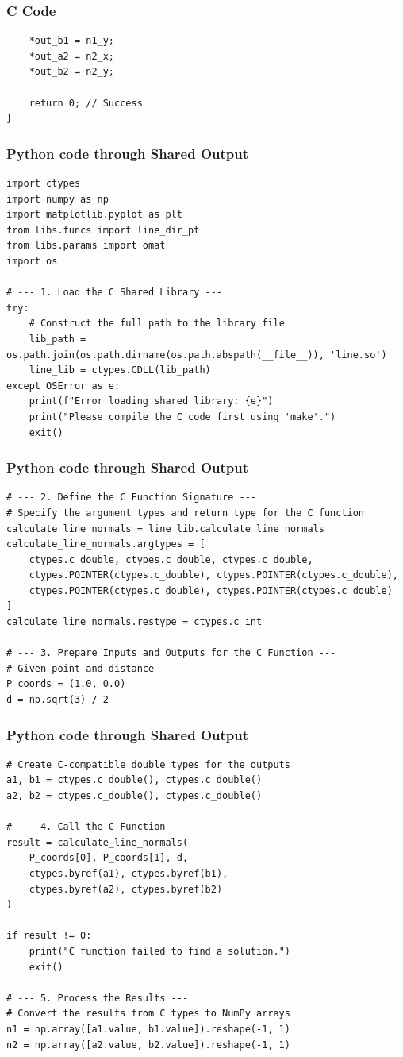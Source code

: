 \documentclass{beamer}
\begin{document}
\begin{frame}[fragile]
\frametitle{C Code }
\begin{lstlisting}
    *out_b1 = n1_y;
    *out_a2 = n2_x;
    *out_b2 = n2_y;

    return 0; // Success
}
\end{lstlisting}    
\end{frame}
\begin{frame}[fragile]
\frametitle{Python code through Shared Output }
\begin{lstlisting}
import ctypes
import numpy as np
import matplotlib.pyplot as plt
from libs.funcs import line_dir_pt
from libs.params import omat
import os

# --- 1. Load the C Shared Library ---
try:
    # Construct the full path to the library file
    lib_path = os.path.join(os.path.dirname(os.path.abspath(__file__)), 'line.so')
    line_lib = ctypes.CDLL(lib_path)
except OSError as e:
    print(f"Error loading shared library: {e}")
    print("Please compile the C code first using 'make'.")
    exit()
\end{lstlisting}    
\end{frame}
\begin{frame}[fragile]
\frametitle{Python code through Shared Output }
\begin{lstlisting}
# --- 2. Define the C Function Signature ---
# Specify the argument types and return type for the C function
calculate_line_normals = line_lib.calculate_line_normals
calculate_line_normals.argtypes = [
    ctypes.c_double, ctypes.c_double, ctypes.c_double,
    ctypes.POINTER(ctypes.c_double), ctypes.POINTER(ctypes.c_double),
    ctypes.POINTER(ctypes.c_double), ctypes.POINTER(ctypes.c_double)
]
calculate_line_normals.restype = ctypes.c_int

# --- 3. Prepare Inputs and Outputs for the C Function ---
# Given point and distance
P_coords = (1.0, 0.0)
d = np.sqrt(3) / 2
\end{lstlisting}    
\end{frame}
\begin{frame}[fragile]
\frametitle{Python code through Shared Output }
\begin{lstlisting}
# Create C-compatible double types for the outputs
a1, b1 = ctypes.c_double(), ctypes.c_double()
a2, b2 = ctypes.c_double(), ctypes.c_double()

# --- 4. Call the C Function ---
result = calculate_line_normals(
    P_coords[0], P_coords[1], d,
    ctypes.byref(a1), ctypes.byref(b1),
    ctypes.byref(a2), ctypes.byref(b2)
)

if result != 0:
    print("C function failed to find a solution.")
    exit()

# --- 5. Process the Results ---
# Convert the results from C types to NumPy arrays
n1 = np.array([a1.value, b1.value]).reshape(-1, 1)
n2 = np.array([a2.value, b2.value]).reshape(-1, 1)
\end{lstlisting}    
\end{frame}
\end{document}
